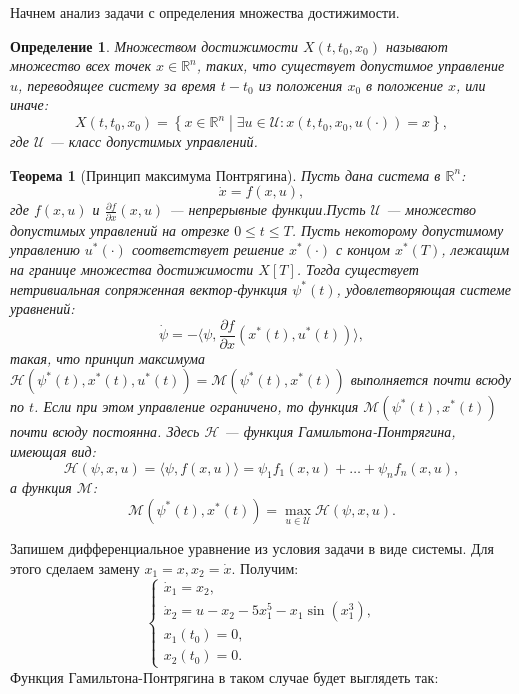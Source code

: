 \documentclass[11pt]{article}
\newtheorem{theorem}{Теорема}
\newtheorem{definition}{Определение}
\begin{document}
\newpage
{}
Начнем анализ задачи с определения множества достижимости.
\begin{definition}
	Множеством достижимости \( X (t,t_0,x_0) \) называют множество всех точек \( x \in \mathbb{R}^n \), таких, что существует допустимое управление \(u \), переводящее систему за время \( t - t_0 \) из положения \( x_0 \) в положение \( x \), или иначе:
	\[ X(t,t_0,x_0) = \left\{ x \in \mathbb{R}^n \middle| \exists u \in \mathcal{U} : x(t,t_0,x_0,u(\cdot)) = x \right\}, \]
	где \( \mathcal{U} \) --- класс допустимых управлений.
\end{definition}
\begin{theorem}[Принцип максимума Понтрягина]
Пусть дана система в \( \mathbb{R}^n \):
\[ \dot{x} = f(x,u), \]
где \( f(x,u) \) и \( \frac{\partial f}{\partial x}(x, u) \) --- непрерывные функции.Пусть \( \mathcal{U} \) --- множество допустимых управлений на отрезке \( 0 \le t \le T \). Пусть некоторому допустимому управлению \( u^*(\cdot) \) соответствует решение \( x^*(\cdot) \) с концом \( x^*(T) \), лежащим на границе множества достижимости \( X[T] \). Тогда существует нетривиальная сопряженная вектор-функция \( \psi^*(t) \), удовлетворяющая системе уравнений:
\[ \dot{\psi} = - \langle \psi, \frac{\partial f}{\partial x}(x^*(t), u^*(t))\rangle, \]
такая, что принцип максимума \( \mathcal{H}(\psi^*(t), x^*(t), u^*(t)) = \mathcal{M}(\psi^*(t), x^*(t)) \) выполняется почти всюду по \( t \). Если при этом управление ограничено, то функция \( \mathcal{M}(\psi^*(t), x^*(t)) \) почти всюду постоянна. Здесь \( \mathcal{H} \) --- функция Гамильтона-Понтрягина, имеющая вид:
\[ \mathcal{H}(\psi, x, u) = \langle \psi, f(x,u) \rangle = \psi_1 f_1 (x, u) + \dots + \psi_n f_n(x,u), \]
а функция \( \mathcal{M} \):
\[ \mathcal{M}(\psi^*(t), x^*(t)) = \max\limits_{u \in \mathcal{U}}\mathcal{H}(\psi, x, u). \]
\end{theorem}
Запишем дифференциальное уравнение из условия задачи в виде системы. Для этого сделаем замену \( x_1 = x , x_2 = \dot{x} \). Получим: 
\begin{equation}\label{dif_syst}
	\begin{cases}
		\dot{x}_1 = x_2,
		\\
		\dot{x}_2 = u - x_2 - 5 x_1^5 - x_1 \sin(x_1^3),
		\\
		x_1(t_0) = 0,
		\\
		x_2(t_0) = 0.
	\end{cases}
\end{equation}
Функция Гамильтона-Понтрягина в таком случае будет выглядеть так:
\end{document}
